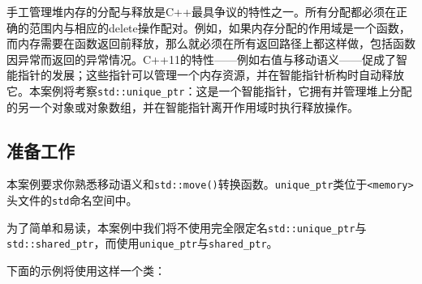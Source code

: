 手工管理堆内存的分配与释放是C++最具争议的特性之一。所有分配都必须在正确的范围内与相应的delete操作配对。例如，如果内存分配的作用域是一个函数，而内存需要在函数返回前释放，那么就必须在所有返回路径上都这样做，包括函数因异常而返回的异常情况。C++11的特性——例如右值与移动语义——促成了智能指针的发展；这些指针可以管理一个内存资源，并在智能指针析构时自动释放它。本案例将考察\texttt{std::\allowbreak{}unique\_\allowbreak{}ptr}：这是一个智能指针，它拥有并管理堆上分配的另一个对象或对象数组，并在智能指针离开作用域时执行释放操作。



\subsection{准备工作}



本案例要求你熟悉移动语义和\texttt{std::\allowbreak{}move()}转换函数。\texttt{unique\_\allowbreak{}ptr}类位于\texttt{<\allowbreak{}memory>}头文件的\texttt{std}命名空间中。



\begin{myNote}
为了简单和易读，本案例中我们将不使用完全限定名\texttt{std::\allowbreak{}unique\_\allowbreak{}ptr}与\texttt{std::\allowbreak{}shared\_\allowbreak{}ptr}，而使用\texttt{unique\_\allowbreak{}ptr}与\texttt{shared\_\allowbreak{}ptr}。
\end{myNote}



下面的示例将使用这样一个类：



